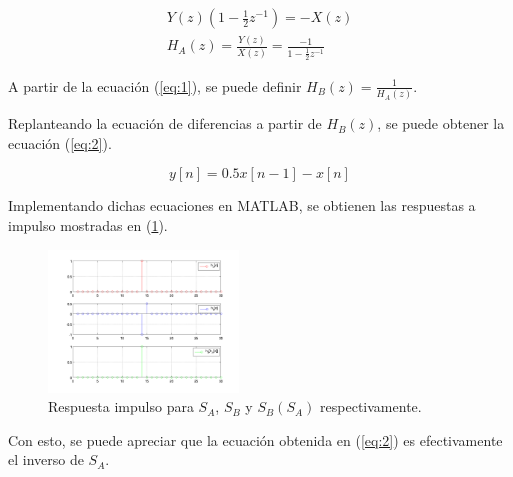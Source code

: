 \documentclass[10pt,conference,a4paper]{IEEEtran}
\begin{document}
\begin{eqnarray*}
\label{eq:1}
Y(z)\left(1-\frac{1}{2}z^{-1}\right)=-X(z)\\
H_A(z)=\frac{Y(z)}{X(z)}=\frac{-1}{1-\frac{1}{2}z^{-1}}\nonumber
\end{eqnarray*}

A partir de la ecuaci\'on (\ref{eq:1}), se puede definir 
$H_B(z)=\frac{1}{H_A(z)}$.

Replanteando la ecuaci\'on de diferencias a partir de $H_B(z)$, se puede 
obtener la ecuaci\'on (\ref{eq:2}).

\begin{equation}
 \label{eq:2}
 y[n]=0.5x[n-1]-x[n]
\end{equation}

Implementando dichas ecuaciones en \textsc{MATLAB}\textregistered, se obtienen 
las respuestas a impulso mostradas en (\ref{fig:img10}).

\begin{figure}[H]
  \centering
  \includegraphics[width=0.45\textwidth]{../img/img10.png}
  \caption{Respuesta impulso para $S_A$, $S_B$ y $S_B(S_A)$ respectivamente.}
  \label{fig:img10}
\end{figure}

Con esto, se puede apreciar que la ecuaci\'on obtenida en (\ref{eq:2}) es 
efectivamente el inverso de $S_A$.
\end{document}
